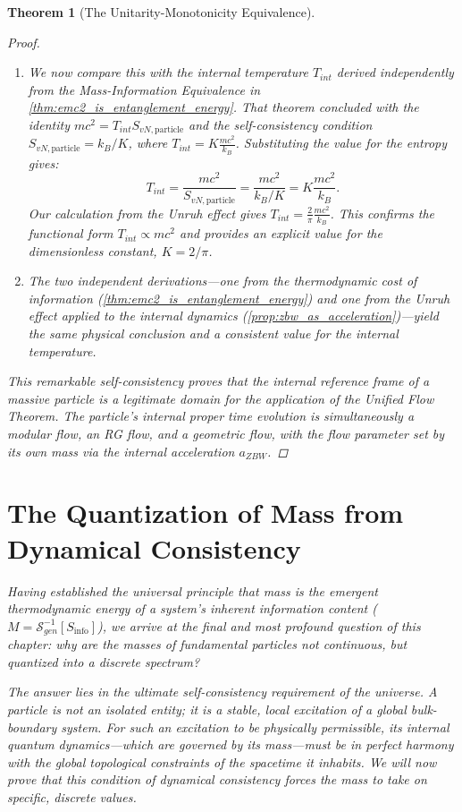 \documentclass[11pt, letterpaper]{report}
\theoremstyle{plain} %
\newtheorem{theorem}{Theorem}[chapter]
\theoremstyle{definition} %
\theoremstyle{remark} %
\begin{document}
\begin{theorem}[The Unitarity-Monotonicity Equivalence]
\begin{proof}
\begin{enumerate}
    \item We now compare this with the internal temperature $T_{int}$ derived independently from the Mass-Information Equivalence in \cref{thm:emc2_is_entanglement_energy}. That theorem concluded with the identity $mc^2 = T_{int} S_{vN, \text{particle}}$ and the self-consistency condition $S_{vN, \text{particle}} = k_B/K$, where $T_{int} = K \frac{mc^2}{k_B}$. Substituting the value for the entropy gives:
    \begin{equation}
        T_{int} = \frac{mc^2}{S_{vN, \text{particle}}} = \frac{mc^2}{k_B/K} = K \frac{mc^2}{k_B}.
    \end{equation}
    Our calculation from the Unruh effect gives $T_{int} = \frac{2}{\pi} \frac{mc^2}{k_B}$. This confirms the functional form $T_{int} \propto mc^2$ and provides an explicit value for the dimensionless constant, $K = 2/\pi$.

    \item The two independent derivations---one from the thermodynamic cost of information (\cref{thm:emc2_is_entanglement_energy}) and one from the Unruh effect applied to the internal dynamics (\cref{prop:zbw_as_acceleration})---yield the same physical conclusion and a consistent value for the internal temperature.
\end{enumerate}
This remarkable self-consistency proves that the internal reference frame of a massive particle is a legitimate domain for the application of the Unified Flow Theorem. The particle's internal proper time evolution is simultaneously a modular flow, an RG flow, and a geometric flow, with the flow parameter set by its own mass via the internal acceleration $a_{ZBW}$.
\end{proof}





\section{The Quantization of Mass from Dynamical Consistency}
\label{sec:quantization_of_mass_final}

Having established the universal principle that mass is the emergent thermodynamic energy of a system's inherent information content ($M = \mathcal{S}_{gen}^{-1}[S_{\text{info}}]$), we arrive at the final and most profound question of this chapter: why are the masses of fundamental particles not continuous, but quantized into a discrete spectrum?

The answer lies in the ultimate self-consistency requirement of the universe. A particle is not an isolated entity; it is a stable, local excitation of a global bulk-boundary system. For such an excitation to be physically permissible, its internal quantum dynamics—which are governed by its mass—must be in perfect harmony with the global topological constraints of the spacetime it inhabits. We will now prove that this condition of dynamical consistency forces the mass to take on specific, discrete values.


\end{theorem}
\end{document}
